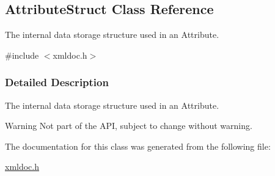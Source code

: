\hypertarget{classAttributeStruct}{
\subsection{AttributeStruct Class Reference}
\label{d6/d23/classAttributeStruct}
}


The internal data storage structure used in an Attribute.  




{\ttfamily \#include $<$xmldoc.h$>$}



\subsubsection{Detailed Description}
The internal data storage structure used in an Attribute. \begin{DoxyWarning}{Warning}
Not part of the API, subject to change without warning. 
\end{DoxyWarning}


The documentation for this class was generated from the following file:\begin{DoxyCompactItemize}
\item 
\hyperlink{xmldoc_8h}{xmldoc.h}\end{DoxyCompactItemize}
